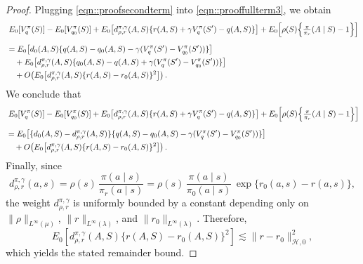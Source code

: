 \documentclass[11pt]{article}
\theoremstyle{plain}
\begin{document}
\begin{proof}
Plugging \eqref{eqn::proofsecondterm} into \eqref{eqn::prooffullterm3}, we obtain
\begin{align*}
&\; E_0[V_q^\pi(S)] - E_0[V_{q_0}^\pi(S)] 
   + E_0\!\left[d_{\rho,r}^{\pi,\gamma}(A,S)\{r(A,S) + \gamma V_q^\pi(S') - q(A,S)\}\right]  
   + E_0\!\left[\rho(S)\Bigl\{\tfrac{\pi}{\pi_r}(A \mid S) - 1\Bigr\}\right] \\[6pt]
&= E_0\!\left[d_0(A,S)\{q(A,S) - q_0(A,S) - \gamma (V_q^\pi(S') - V_{q_0}^\pi(S'))\}\right] \\
&\quad + E_0\!\left[d_{\rho,r}^{\pi,\gamma}(A,S)\{q_0(A,S) - q(A,S) + \gamma (V_q^\pi(S') - V_{q_0}^\pi(S'))\}\right] \\
&\quad + O\!\left(E_0\!\left[d_{\rho,r}^{\pi,\gamma}(A,S)\{r(A,S) - r_0(A,S)\}^2\right]\right).
\end{align*}
We conclude that
\begin{align*}
&\; E_0[V_q^\pi(S)] - E_0[V_{q_0}^\pi(S)] 
   + E_0\!\left[d_{\rho,r}^{\pi,\gamma}(A,S)\{r(A,S) + \gamma V_q^\pi(S') - q(A,S)\}\right]  
   + E_0\!\left[\rho(S)\Bigl\{\tfrac{\pi}{\pi_r}(A \mid S) - 1\Bigr\}\right] \\[6pt]
&= E_0\!\left[\{d_0(A,S) - d_{\rho,r}^{\pi,\gamma}(A,S)\}\{q(A,S) - q_0(A,S) - \gamma (V_q^\pi(S') - V_{q_0}^\pi(S'))\}\right] \\
&\quad + O\!\left(E_0\!\left[d_{\rho,r}^{\pi,\gamma}(A,S)\{r(A,S) - r_0(A,S)\}^2\right]\right).
\end{align*}
Finally, since
\[
d_{\rho,r}^{\pi,\gamma}(a,s)
= \rho(s)\,\frac{\pi(a \mid s)}{\pi_r(a \mid s)}
= \rho(s)\,\frac{\pi(a \mid s)}{\pi_0(a \mid s)}\,\exp\{r_0(a,s)-r(a,s)\},
\]
the weight $d_{\rho,r}^{\pi,\gamma}$ is uniformly bounded by a constant depending only on
$\|\rho\|_{L^\infty(\mu)}$, $\|r\|_{L^\infty(\lambda)}$, and $\|r_0\|_{L^\infty(\lambda)}$.
Therefore,
\[
E_0\!\left[d_{\rho,r}^{\pi,\gamma}(A,S)\{r(A,S) - r_0(A,S)\}^2\right]
\lesssim \|r-r_0\|_{\mathcal{H},0}^2,
\]
which yields the stated remainder bound.

\end{proof}
\end{document}
